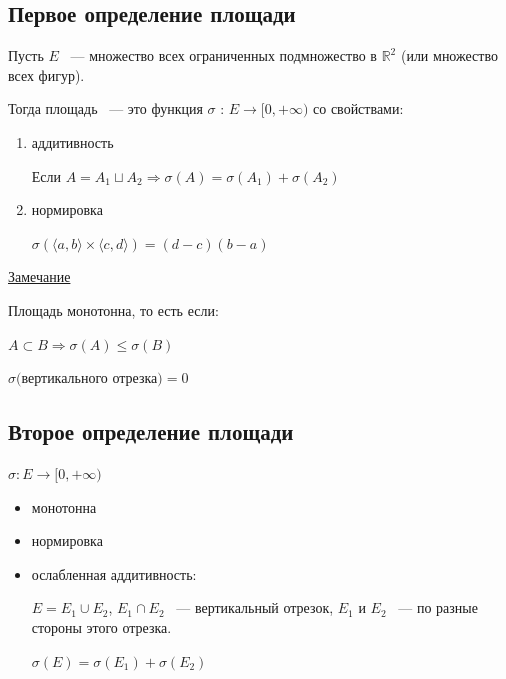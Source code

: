 \documentclass{article}
\begin{document}
			\subsection{Первое определение площади}
			
				Пусть $E$ ~--- множество всех ограниченных подмножество в $\mathbb{R}^2$ (или множество всех фигур).
			
				Тогда площадь ~--- это функция $\sigma$ : $E \rightarrow [0, +\infty)$ со свойствами:
			
				\begin{enumerate}
			
					\item аддитивность
				
						Если $A = A_1 \sqcup A_2 \Rightarrow \sigma(A) = \sigma(A_1) + \sigma(A_2)$
				
					\item нормировка
				
						$\sigma(\langle a, b \rangle \times \langle c, d \rangle) = (d - c)(b - a)$ 
		
				\end{enumerate}
			
				\underline{Замечание}
			
					Площадь монотонна, то есть если:	
			
					$A \subset B \Rightarrow \sigma(A) \leq \sigma(B)$
			
					$\sigma($вертикального отрезка$) = 0$
				
			\subsection{Второе определение площади}
			
				$\sigma : E \rightarrow [0, +\infty)$
				
				\begin{itemize}
				
					\item монотонна
					
					\item нормировка
					
					\item ослабленная аддитивность:
					
						$E = E_1 \cup E_2$, $E_1 \cap E_2$ ~--- вертикальный отрезок, $E_1$ и $E_2$ ~--- по разные стороны этого отрезка.
					
						$\sigma(E) = \sigma(E_1) + \sigma(E_2)$
						
				\end{itemize}
				
\end{document}
